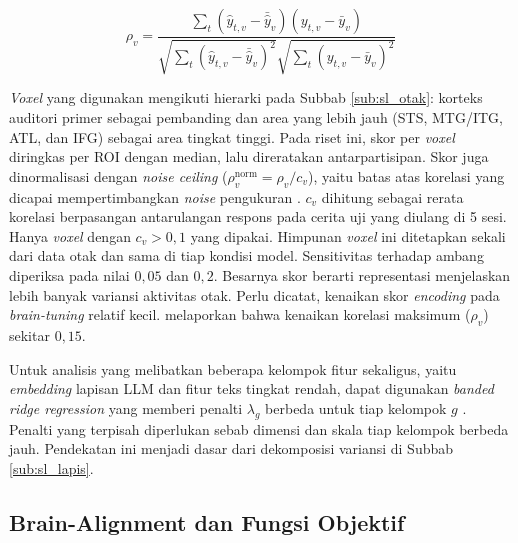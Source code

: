 \begin{equation}
  \rho_v = \frac{\sum_{t}\left(\hat{y}_{t,v}-\bar{\hat{y}}_{v}\right)\left(y_{t,v}-\bar{y}_{v}\right)}{\sqrt{\sum_{t}\left(\hat{y}_{t,v}-\bar{\hat{y}}_{v}\right)^{2}}\sqrt{\sum_{t}\left(y_{t,v}-\bar{y}_{v}\right)^{2}}}
  \label{eq:pearson}
\end{equation}

\textit{Voxel} yang digunakan mengikuti hierarki pada Subbab \ref{sub:sl_otak}: korteks auditori primer sebagai pembanding dan area yang lebih jauh (STS, MTG/ITG, ATL, dan IFG) sebagai area tingkat tinggi. Pada riset ini, skor per \textit{voxel} diringkas per ROI dengan median, lalu direratakan antarpartisipan. Skor juga dinormalisasi dengan \textit{noise ceiling} ($\rho^{\text{norm}}_v = \rho_v / c_v$), yaitu batas atas korelasi yang dicapai mempertimbangkan \textit{noise} pengukuran \autocite{schrimpf2021neural}. $c_v$ dihitung sebagai rerata korelasi berpasangan antarulangan respons pada cerita uji yang diulang di 5 sesi. Hanya \textit{voxel} dengan $c_v > 0{,}1$ yang dipakai. Himpunan \textit{voxel} ini ditetapkan sekali dari data otak dan sama di tiap kondisi model. Sensitivitas terhadap ambang diperiksa pada nilai $0{,}05$ dan $0{,}2$. Besarnya skor berarti representasi menjelaskan lebih banyak variansi aktivitas otak. Perlu dicatat, kenaikan skor \textit{encoding} pada \textit{brain-tuning} relatif kecil. \textcite{negi2025brain} melaporkan bahwa kenaikan korelasi maksimum ($\rho_v$) sekitar $0{,}15$. %
 
Untuk analisis yang melibatkan beberapa kelompok fitur sekaligus, yaitu \textit{embedding} lapisan LLM dan fitur teks tingkat rendah, dapat digunakan \textit{banded ridge regression} yang memberi penalti $\lambda_g$ berbeda untuk tiap kelompok $g$ \autocite{nunez2019banded}. Penalti yang terpisah diperlukan sebab dimensi dan skala tiap kelompok berbeda jauh. Pendekatan ini menjadi dasar dari dekomposisi variansi di Subbab \ref{sub:sl_lapis}.
 
\subsection{Brain-Alignment dan Fungsi Objektif}
\label{sub:sl_alignment}
 
